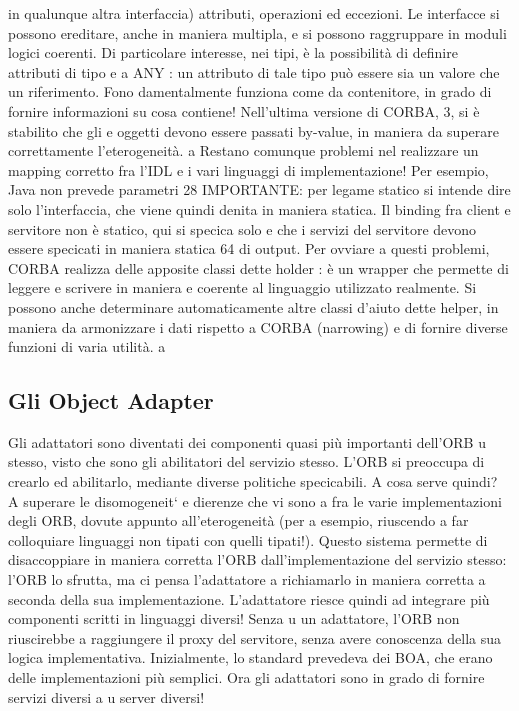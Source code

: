 in qualunque altra interfaccia) attributi, operazioni ed eccezioni. Le interfacce
si possono ereditare, anche in maniera multipla, e si possono raggruppare in
moduli logici coerenti.
Di particolare interesse, nei tipi, è la possibilità di definire attributi di tipo
e
a
ANY : un attributo di tale tipo può essere sia un valore che un riferimento. Fono
damentalmente funziona come da contenitore, in grado di fornire informazioni
su cosa contiene! Nell'ultima versione di CORBA, 3, si è stabilito che gli
e
oggetti devono essere passati by-value, in maniera da superare correttamente
l'eterogeneità.
a
Restano comunque problemi nel realizzare un mapping corretto fra l'IDL e
i vari linguaggi di implementazione! Per esempio, Java non prevede parametri
28 IMPORTANTE: per legame statico si intende dire solo l'interfaccia, che viene quindi
denita in maniera statica. Il binding fra client e servitore non è statico, qui si specica solo
e
che i servizi del servitore devono essere specicati in maniera statica
64
di output. Per ovviare a questi problemi, CORBA realizza delle apposite classi dette holder : è un wrapper che permette
di leggere e scrivere in maniera
e
coerente al linguaggio utilizzato realmente. Si possono anche determinare automaticamente altre classi d'aiuto dette
helper, in maniera da armonizzare i dati
rispetto a CORBA (narrowing) e di fornire diverse funzioni di varia utilità.
a
\subsection{Gli Object Adapter}
Gli adattatori sono diventati dei componenti quasi più importanti dell'ORB
u
stesso, visto che sono gli abilitatori del servizio stesso. L'ORB si preoccupa di
crearlo ed abilitarlo, mediante diverse politiche specicabili.
A cosa serve quindi? A superare le disomogeneit` e dierenze che vi sono
a
fra le varie implementazioni degli ORB, dovute appunto all'eterogeneità (per
a
esempio, riuscendo a far colloquiare linguaggi non tipati con quelli tipati!).
Questo sistema permette di disaccoppiare in maniera corretta l'ORB dall'implementazione del servizio stesso: l'ORB lo
sfrutta, ma ci pensa l'adattatore a
richiamarlo in maniera corretta a seconda della sua implementazione. L'adattatore riesce quindi ad integrare più
componenti scritti in linguaggi diversi! Senza
u
un adattatore, l'ORB non riuscirebbe a raggiungere il proxy del servitore, senza
avere conoscenza della sua logica implementativa.
Inizialmente, lo standard prevedeva dei BOA, che erano delle implementazioni più semplici. Ora gli adattatori sono in
grado di fornire servizi diversi a
u
server diversi!
